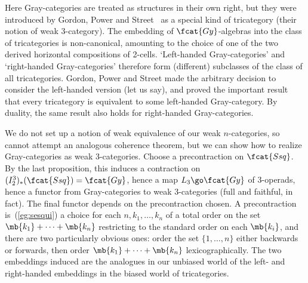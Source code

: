 \begin{example}
Here Gray-categories are treated as structures in their own right, but they
were introduced by Gordon,%
%
%
Power and Street~\cite{GPS} as a special kind of tricategory%
%
%
(their notion of weak 3-category).  The embedding of
$\fcat{Gy}$-algebras into the class of tricategories is non-canonical,
amounting to the choice of one of the two derived horizontal compositions
of 2-cells.  `Left-handed%
%
%
Gray-categories' and `right-handed
Gray-categories' therefore form (different) subclasses of the class of all
tricategories.  Gordon, Power and Street made the arbitrary decision to
consider the left-handed version (let us say), and proved the important
result that every tricategory is equivalent%
%
%
to some left-handed
Gray-category.  By duality, the same result also holds for right-handed
Gray-categories.  

We do not set up a notion of weak equivalence of our weak $n$-categories,
so cannot attempt an analogous coherence theorem, but we can show how to
realize Gray-categories as weak 3-categories.  Choose a precontraction on
$\fcat{Ssq}$.  By the last proposition, this induces a contraction on
$(I^3_2)_*(\fcat{Ssq}) = \fcat{Gy}$, hence a map $L_3 \go \fcat{Gy}$ of
3-operads, hence a functor from Gray-categories to weak 3-categories (full
and faithful, in fact).  The final functor depends on the precontraction
chosen.  A precontraction is~(\ref{eg:sesqui}) a choice for each $n, k_1,
\ldots, k_n$ of a total order on the set $\mb{k_1} + \cdots + \mb{k_n}$
restricting to the standard order on each $\mb{k_i}$, and there are two
particularly obvious ones: order the set $\{1, \ldots, n\}$ either
backwards or forwards, then order $\mb{k_1} + \cdots + \mb{k_n}$
lexicographically.  The two embeddings induced are the analogues in our
unbiased world of the left- and right-handed embeddings in the biased world
of tricategories.
\end{example}

